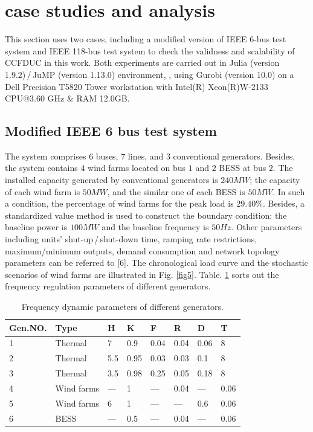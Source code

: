 \documentclass[lettersize,journal]{IEEEtran}
\begin{document}
\vspace{-0.125in}
\section{case studies and analysis}
\vspace{-0.065in}
This section uses two cases, including a modified version of IEEE 6-bus test system and IEEE 118-bus test system to check the validness and scalability of CCFDUC in this work. Both experiments are carried out in Julia (version 1.9.2)\,/\,JuMP (version 1.13.0) environment, \cite{Lubin2023}, using Gurobi (version 10.0) on a Dell Precision T5820 Tower workstation with Intel(R) Xeon(R)W-2133 CPU@3.60 GHz \& RAM 12.0GB.

\vspace{-1.25em}
\subsection{Modified IEEE 6 bus test system}
\vspace{-0.25em}

The system comprises $6$ buses, $7$ lines, and $3$ conventional generators. Besides, the system contains $4$ wind farms located on bus $1$ and $2$ BESS at bus $2$. The installed capacity generated by conventional generators is $240MW$; the capacity of each wind farm is $50MW$, and the similar one of each BESS is $50MW$. In such a condition, the percentage of wind farms for the peak load is $29.40\%$. Besides, a standardized value method is used to construct the boundary condition: the baseline power is $100MW$ and the baseline frequency is $50Hz$. Other parameters including units’ shut-up\,/\,shut-down time, ramping rate restrictions, maximum/minimum outputs, demand consumption and network topology parameters can be referred to [6]. The chronological load curve and the stochastic scenarios of wind farms are illustrated in Fig. \ref{fig5}. Table. \ref{table 1} sorts out the frequency regulation parameters of different generators.

\begin{table}[!t]\vspace{-0.25in}
	\caption{Frequency dynamic parameters of different generators.}
	\label{table 1}
	\begin{tabular}{llllllll}
		\hline
		Gen.NO. & Type       & H   & K    & F    & R    & D    & T    \\
		\hline
		1       & Thermal    & 7   & 0.9  & 0.04 & 0.04 & 0.06 & 8    \\
		2       & Thermal    & 5.5 & 0.95 & 0.03 & 0.03 & 0.1  & 8    \\
		3       & Thermal    & 3.5 & 0.98 & 0.25 & 0.05 & 0.18 & 8    \\
		4       & Wind farms & —   & 1    & —    & 0.04 & —    & 0.06 \\
		5       & Wind farms & 6   & 1    & —    & —    & 0.6  & 0.06 \\
		6       & BESS       & —   & 0.5  & —    & 0.04 & —    & 0.06 \\
		\hline
	\end{tabular}
\end{table}
\end{document}
